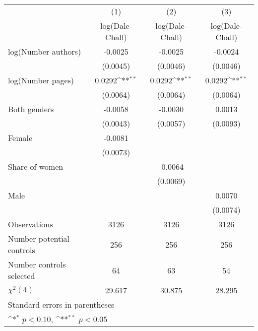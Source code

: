 {
\def\sym#1{\ifmmode^{#1}\else\(^{#1}\)\fi}
\begin{tabular}{l*{3}{c}}
\hline\hline
                    &\multicolumn{1}{c}{(1)}&\multicolumn{1}{c}{(2)}&\multicolumn{1}{c}{(3)}\\
                    &\multicolumn{1}{c}{log(Dale-Chall)}&\multicolumn{1}{c}{log(Dale-Chall)}&\multicolumn{1}{c}{log(Dale-Chall)}\\
\hline
\hspace{3mm}log(Number authors)&     -0.0025        &     -0.0025        &     -0.0024        \\
                    &    (0.0045)        &    (0.0046)        &    (0.0046)        \\
[1em]
\hspace{3mm}log(Number pages)&      0.0292\sym{**}&      0.0292\sym{**}&      0.0292\sym{**}\\
                    &    (0.0064)        &    (0.0064)        &    (0.0064)        \\
[1em]
\hspace{3mm}Both genders&     -0.0058        &     -0.0030        &      0.0013        \\
                    &    (0.0043)        &    (0.0057)        &    (0.0093)        \\
[1em]
\hspace{3mm}Female  &     -0.0081        &                    &                    \\
                    &    (0.0073)        &                    &                    \\
[1em]
\hspace{3mm}Share of women&                    &     -0.0064        &                    \\
                    &                    &    (0.0069)        &                    \\
[1em]
\hspace{3mm}Male    &                    &                    &      0.0070        \\
                    &                    &                    &    (0.0074)        \\
\hline
Observations        &        3126        &        3126        &        3126        \\
Number potential controls&         256        &         256        &         256        \\
Number controls selected&          64        &          63        &          54        \\
$\chi^2(4)$         &      29.617        &      30.875        &      28.295        \\
\hline\hline
\multicolumn{4}{l}{\footnotesize Standard errors in parentheses}\\
\multicolumn{4}{l}{\footnotesize \sym{*} \(p<0.10\), \sym{**} \(p<0.05\)}\\
\end{tabular}
}
